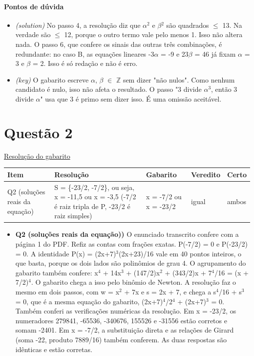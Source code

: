 \documentclass{article}%
\begin{document}
\paragraph{Pontos de dúvida}%
\begin{itemize}%
\item%
\textit{(solution)} No passo 4, a resolução diz que $\alpha$$^2$ e $\beta$$^2$ são quadrados $\leq$ 13. Na verdade são $\leq$ 12, porque o outro termo vale pelo menos 1. Isso não altera nada. O passo 6, que confere os sinais das outras três combinações, é redundante: no caso B, as equações lineares -3$\alpha$ = -9 e 23$\beta$ = 46 já fixam $\alpha$ = 3 e $\beta$ = 2. Isso é só redação e não é erro.%
\item%
\textit{(key)} O gabarito escreve $\alpha$, $\beta$ $\in$ $\mathbb{Z}$ sem dizer "não nulos". Como nenhum candidato é nulo, isso não afeta o resultado. O passo "3 divide $\alpha$$^3$, então 3 divide $\alpha$" usa que 3 é primo sem dizer isso. É uma omissão aceitável.%
\end{itemize}%
\section*{Questão 2}%
\href{https://poliedroresolve.sistemapoliedro.com.br/vestibulares/ime/2026/ime-2-fase-dia-1-23-10-2025-2-fase-dia-1/dissertativa-2-matematica-2-fase-dia-1-ime-2026}{Resolução do gabarito}\par\smallskip%
\begin{longtable}{@{}p{} p{} p{} p{} p{}@{}}\toprule Item & Resolução & Gabarito & Veredito & Certo \\ \midrule
Q2 (soluções reais da equação) & S = \{-23/2, -7/2\}, ou seja, x = -11,5 ou x = -3,5 (-7/2 é raiz tripla de P, -23/2 é raiz simples) & x = -7/2 ou x = -23/2 & igual & ambos \\
\bottomrule\end{longtable}%
\begin{itemize}%
\item%
\textbf{Q2 (soluções reais da equação))} O enunciado transcrito confere com a página 1 do PDF. Refiz as contas com frações exatas. P(-7/2) = 0 e P(-23/2) = 0. A identidade P(x) = (2x+7)$^3$(2x+23)/16 vale em 40 pontos inteiros, o que basta, porque os dois lados são polinômios de grau 4. O agrupamento do gabarito também confere: x$^{4}$ + 14x$^3$ + (147/2)x$^2$ + (343/2)x + 7$^{4}$/16 = (x + 7/2)$^{4}$. O gabarito chega a isso pelo binômio de Newton. A resolução faz o mesmo em dois passos, com w = x$^2$ + 7x e s = 2x + 7, e chega a s$^{4}$/16 + s$^3$ = 0, que é a mesma equação do gabarito, (2x+7)$^{4}$/2$^{4}$ + (2x+7)$^3$ = 0. Também conferi as verificações numéricas da resolução. Em x = -23/2, os numeradores 279841, -65536, -340676, 155526 e -31556 estão corretos e somam -2401. Em x = -7/2, a substituição direta e as relações de Girard (soma -22, produto 7889/16) também conferem. As duas respostas são idênticas e estão corretas.%
\end{itemize}%
\end{document}
